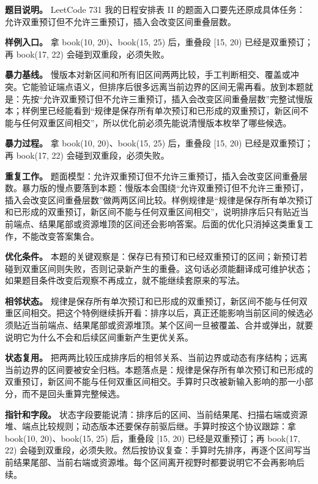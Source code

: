 \textbf{题目说明。} LeetCode 731 我的日程安排表 II 的题面入口要先还原成具体任务：允许双重预订但不允许三重预订，插入会改变区间重叠层数。

\textbf{样例入口。} 拿 book(10, 20)、book(15, 25) 后，重叠段 [15, 20) 已经是双重预订；再 book(17, 22) 会碰到双重段，必须失败。

\textbf{暴力基线。} 慢版本对新区间和所有旧区间两两比较，手工判断相交、覆盖或冲突。它能验证端点语义，但排序后很多远离当前边界的区间无需再看。放到本题就是：先按“允许双重预订但不允许三重预订，插入会改变区间重叠层数”完整试慢版本；样例里已经能看到“规律是保存所有单次预订和已形成的双重预订，新区间不能与任何双重区间相交”，所以优化前必须先能说清慢版本枚举了哪些候选。

\textbf{暴力过程。} 拿 book(10, 20)、book(15, 25) 后，重叠段 [15, 20) 已经是双重预订；再 book(17, 22) 会碰到双重段，必须失败。

\textbf{重复工作。} 题面模型：允许双重预订但不允许三重预订，插入会改变区间重叠层数。暴力版的慢点要落到本题：慢版本会围绕“允许双重预订但不允许三重预订，插入会改变区间重叠层数”做两两区间比较。样例规律是“规律是保存所有单次预订和已形成的双重预订，新区间不能与任何双重区间相交”，说明排序后只有贴近当前端点、结果尾部或资源堆顶的区间还会影响答案。后面的优化只消掉这类重复工作，不能改变答案集合。

\textbf{优化条件。} 本题的关键观察是：保存已有预订和已经双重预订的区间；新预订若碰到双重区间则失败，否则记录新产生的重叠。这句话必须能翻译成可维护状态；如果题目条件改变后观察不再成立，就不能继续套原来的写法。

\textbf{相邻状态。} 规律是保存所有单次预订和已形成的双重预订，新区间不能与任何双重区间相交。把这个特例继续拆开看：排序以后，真正还能影响当前区间的候选必须贴近当前端点、结果尾部或资源堆顶。某个区间一旦被覆盖、合并或弹出，就要说明它为什么不会和后续区间重新产生更优关系。

\textbf{状态复用。} 把两两比较压成排序后的相邻关系、当前边界或动态有序结构；远离当前边界的区间要被安全归档。本题落点是：规律是保存所有单次预订和已形成的双重预订，新区间不能与任何双重区间相交。手算时只改被新输入影响的那一小部分，而不是回头重算完整候选。

\textbf{指针和字段。} 状态字段要能说清：排序后的区间、当前结果尾、扫描右端或资源堆、端点比较规则；动态版本还要保存前驱后继。手算时按这个协议跟踪：拿 book(10, 20)、book(15, 25) 后，重叠段 [15, 20) 已经是双重预订；再 book(17, 22) 会碰到双重段，必须失败。然后按协议复查：手算时先排序，再逐个区间写当前结果尾部、当前右端或资源堆。每个区间离开视野时都要说明它不会再影响后续。

